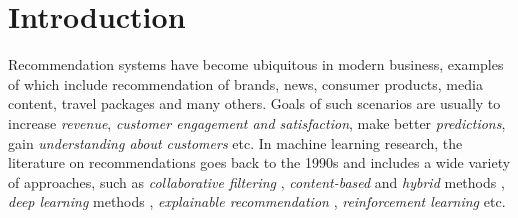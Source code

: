 \section{Introduction}

Recommendation systems have become ubiquitous in modern business, 
examples of which include recommendation of brands, news, consumer products, media content, 
travel packages and many others. Goals of such scenarios are usually to increase {\em revenue},
{\em customer engagement and satisfaction}, make better {\em predictions}, 
gain {\em understanding about customers} etc.
In machine learning research, the literature on recommendations goes back to the 1990s \cite{Tapestry, grouplens}
and includes a wide variety of approaches, such as {\em collaborative filtering} \cite{bell_lessons,koren2009matrix,SVD++,PMF}, 
{\em content-based} and {\em hybrid} methods \cite{rendle,ffm,bpr,pairwise,multiverse}, 
{\em deep learning} methods \cite{karatzoglou,PNN,cheng2016wide,lian2018xdeepfm,he2017neural,youtube,nvidia,survival},
 {\em explainable recommendation} \cite{explainable,rl_explainable}, {\em reinforcement learning} \cite{rl_explainable,rl,rl_negative} etc.


